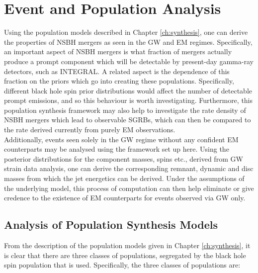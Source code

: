 \chapter{Event and Population Analysis}\label{ch:analysis}

    Using the population models described in Chapter \ref{ch:synthesis}, one can derive
    the properties of NSBH mergers as seen in the GW and EM regimes.
    Specifically, an important aspect of NSBH mergers is what fraction of mergers
    actually produce a prompt component which will be detectable by present-day
    gamma-ray detectors, such as INTEGRAL. A related aspect is the dependence of this
    fraction on the priors which go into creating these populations. Specifically,
    different black hole spin prior distributions would affect the number of detectable
    prompt emissions, and so this behaviour is worth investigating. Furthermore, this
    population synthesis framework may also help to investigate the rate density of NSBH
    mergers which lead to observable SGRBs, which can then be compared to the rate
    derived currently from purely EM observations.\\
    Additionally, events seen solely in the GW regime without any confident EM
    counterparts may be analysed using the framework set up here. Using the posterior
    distributions for the component masses, spins etc., derived from GW strain data
    analysis, one can derive the corresponding remnant, dynamic and disc masses from
    which the jet energetics can be derived. Under the assumptions of the underlying
    model, this process of computation can then help eliminate or give credence to the
    existence of EM counterparts for events observed via GW only.

\section{Analysis of Population Synthesis Models}

    From the description of the population models given in Chapter \ref{ch:synthesis},
    it is clear that there are three classes of populations, segregated by the black
    hole spin population that is used. Specifically, the three classes of populations
    are:

